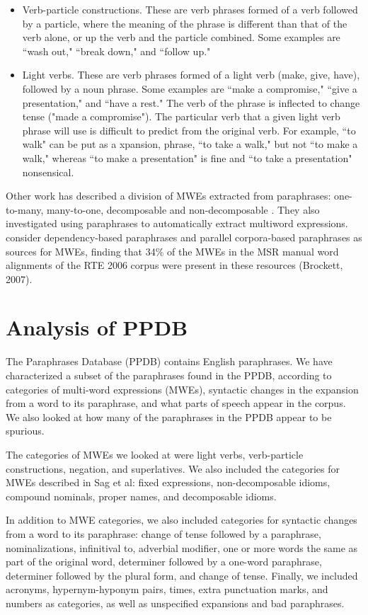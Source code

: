 \documentclass[11pt]{article}
\begin{document}
\begin{itemize}
\item Verb-particle constructions. These are verb phrases formed of a verb followed by a particle, where the meaning of the phrase is different than that of the verb alone, or up the verb and the particle combined. Some examples are ``wash out," ``break down," and ``follow up." 

\item Light verbs. These are verb phrases formed of a light verb (make, give, have), followed by a noun phrase. Some examples are ``make a compromise," ``give a presentation," and ``have a rest." The verb of the phrase is inflected to change tense ("made a compromise"). The particular verb that a given light verb phrase will use is difficult to predict from the original verb. For example, ``to walk" can be put as a xpansion,  phrase, ``to take a walk," but not ``to make a walk," whereas ``to make a presentation" is fine and ``to take a presentation" nonsensical.
\end{itemize}

Other work has described a division of MWEs extracted from paraphrases: one-to-many, many-to-one,  decomposable and non-decomposable \cite{dpm}. They also investigated using paraphrases to automatically extract multiword expressions. \cite{dpm} consider dependency-based paraphrases and parallel corpora-based paraphrases as sources for MWEs, finding that 34\% of the MWEs in the MSR manual word alignments of the RTE 2006 corpus were present in these resources (Brockett, 2007). 

\section{Analysis of PPDB}
The Paraphrases Database (PPDB) contains English paraphrases. We have characterized a subset of the paraphrases found in the PPDB, according to categories of multi-word expressions (MWEs), syntactic changes in the expansion from a word to its paraphrase, and what parts of speech appear in the corpus. We also looked at how many of the paraphrases in the PPDB appear to be spurious.

The categories of MWEs we looked at were light verbs, verb-particle constructions, negation, and superlatives. We also included the categories for MWEs described in Sag et al: fixed expressions, non-decomposable idioms, compound nominals, proper names, and decomposable idioms. 

In addition to MWE categories, we also included categories for syntactic changes from a word to its paraphrase: change of tense followed by a paraphrase, nominalizations, infinitival to, adverbial modifier, one or more words the same as part of the original word, determiner followed by a one-word paraphrase, determiner followed by the plural form, and change of tense. Finally, we included acronyms, hypernym-hyponym pairs, times, extra punctuation marks, and numbers as categories, as well as unspecified expansions and bad paraphrases. 
\end{document}

